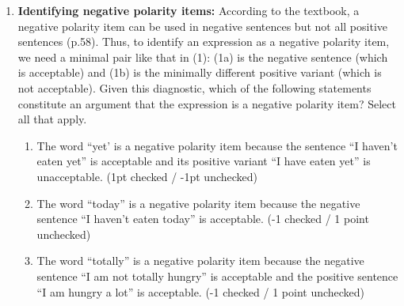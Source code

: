 \documentclass[a4,11pt]{article}
\begin{document}
\begin{enumerate}[leftmargin = 12pt]
      \begin{enumerate}[noitemsep]
        \item The set of white dogs is a proper subset of the set of dogs.
        \item The set of cats is a superset of the set of mice.
	\item The intersection of the set of cats with the set of dogs is empty.
	\item The set of cats is a superset of the set of sleeping cats.
	\item The union of the set of white cats and the set of non-white cats is the set of cats.
	\item The intersection of the set of dogs and the set of black dogs is the set of black dogs.
         \end{enumerate}

 {\bf Model answer:} The following statements are true: (a), (c), (d), (e) and (f).
 
 The statement in (b) is false: in order for it to be true, every mouse would have to be an element of the set of cats. 
  
  \item {\bf Identifying negative polarity items:} According to the textbook, a negative polarity item can be used in negative sentences but not all positive sentences (p.58). Thus, to identify an expression as a negative polarity item, we need a minimal pair like that in (1): (1a) is the negative sentence (which is acceptable) and (1b) is the minimally different positive variant (which is not acceptable). Given this diagnostic, which of the following statements constitute an argument that the expression is a negative polarity item? Select all that apply.
  
         \begin{enumerate}[noitemsep]

       \item The word ``yet' is a negative polarity item because the sentence ``I haven't eaten yet'' is acceptable and its positive variant  ``I have eaten yet'' is unacceptable. (1pt checked / -1pt unchecked)

       \item The word ``today'' is a negative polarity item because the negative sentence ``I haven't eaten today'' is acceptable. (-1 checked / 1 point unchecked)
              
       \item The word ``totally'' is a negative polarity item because the negative sentence ``I am not totally hungry'' is acceptable and the positive sentence ``I am hungry a lot'' is acceptable. (-1 checked / 1 point unchecked)


\end{enumerate}
\end{enumerate}
\end{document}
